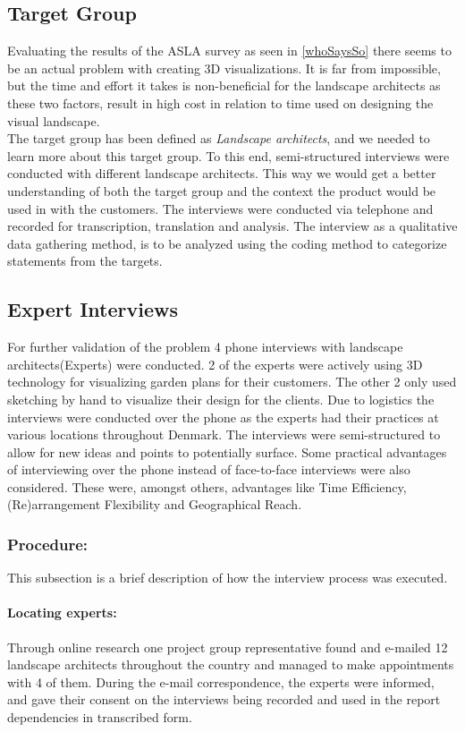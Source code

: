 	\subsection{Target Group}\label{sec:targetGroup}
	Evaluating the results of the ASLA survey as seen in \autoref{whoSaysSo} there seems to be an actual problem with creating 3D visualizations. It is far from impossible, but the time and effort it takes is non-beneficial for the landscape architects as these two factors, result in high cost in relation to time used on designing the visual landscape. \\
	The target group has been defined as \textit{Landscape architects}, and we needed to learn more about this target group. To this end, semi-structured interviews were conducted with different landscape architects. This way we would get a better understanding of both the target group and the context the product would be used in with the customers. The interviews were conducted via telephone and recorded for transcription, translation and analysis. The interview as a qualitative data gathering method, is to be analyzed using the coding method to categorize statements from the targets.
	
	\subsection{Expert Interviews}\label{sec:expertInterviews}
	For further validation of the problem 4 phone interviews with landscape architects(Experts) were conducted. 2 of the experts were actively using 3D technology for visualizing garden plans for their customers. The other 2 only used sketching by hand to visualize their design for the clients. Due to logistics the interviews were conducted over the phone as the experts had their practices at various locations throughout Denmark. The interviews were semi-structured to allow for new ideas and points to potentially surface. Some practical advantages of interviewing over the phone instead of face-to-face interviews were also considered. These were, amongst others, advantages like Time Efficiency, (Re)arrangement Flexibility and Geographical Reach\cite{telephoneInterview}. 
		
		\subsubsection{Procedure:}
		This subsection is a brief description of how the interview process was executed.
		
		\paragraph*{Locating experts:}
		Through online research one project group representative found and e-mailed 12 landscape architects throughout the country and managed to make appointments with 4 of them. During the e-mail correspondence, the experts were informed, and gave their consent on the interviews being recorded and used in the report dependencies in transcribed form.
		
